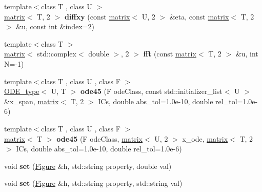 \begin{DoxyCompactItemize}
\item 
\hypertarget{namespacekeycpp_adbb28bb59e9e552598c05ebe9d1af397}{{\footnotesize template$<$class T , class U $>$ }\\\hyperlink{classkeycpp_1_1matrix}{matrix}$<$ T, 2 $>$ {\bfseries diffxy} (const \hyperlink{classkeycpp_1_1matrix}{matrix}$<$ U, 2 $>$ \&eta, const \hyperlink{classkeycpp_1_1matrix}{matrix}$<$ T, 2 $>$ \&u, const int \&index=2)}\label{namespacekeycpp_adbb28bb59e9e552598c05ebe9d1af397}

\item 
\hypertarget{namespacekeycpp_a1fcfb748997291434fe9db7dbffd8c6f}{{\footnotesize template$<$class T $>$ }\\\hyperlink{classkeycpp_1_1matrix}{matrix}$<$ std\-::complex$<$ double $>$, 2 $>$ {\bfseries fft} (const \hyperlink{classkeycpp_1_1matrix}{matrix}$<$ T, 2 $>$ \&u, int N=-\/1)}\label{namespacekeycpp_a1fcfb748997291434fe9db7dbffd8c6f}

\item 
\hypertarget{namespacekeycpp_a6d7114f640a4a253a1d50ffc810bdad0}{{\footnotesize template$<$class T , class U , class F $>$ }\\\hyperlink{structkeycpp_1_1_o_d_e__type}{O\-D\-E\-\_\-type}$<$ U, T $>$ {\bfseries ode45} (F ode\-Class, const std\-::initializer\-\_\-list$<$ U $>$ \&x\-\_\-span, \hyperlink{classkeycpp_1_1matrix}{matrix}$<$ T, 2 $>$ I\-Cs, double abs\-\_\-tol=1.\-0e-\/10, double rel\-\_\-tol=1.\-0e-\/6)}\label{namespacekeycpp_a6d7114f640a4a253a1d50ffc810bdad0}

\item 
\hypertarget{namespacekeycpp_aeea0edbbd76794e73bfade1d428f5dd7}{{\footnotesize template$<$class T , class U , class F $>$ }\\\hyperlink{classkeycpp_1_1matrix}{matrix}$<$ T $>$ {\bfseries ode45} (F ode\-Class, \hyperlink{classkeycpp_1_1matrix}{matrix}$<$ U, 2 $>$ x\-\_\-ode, \hyperlink{classkeycpp_1_1matrix}{matrix}$<$ T, 2 $>$ I\-Cs, double abs\-\_\-tol=1.\-0e-\/10, double rel\-\_\-tol=1.\-0e-\/6)}\label{namespacekeycpp_aeea0edbbd76794e73bfade1d428f5dd7}

\item 
\hypertarget{namespacekeycpp_afcd6ae07fc18f5374868fe314f00108c}{void {\bfseries set} (\hyperlink{classkeycpp_1_1_figure}{Figure} \&h, std\-::string property, double val)}\label{namespacekeycpp_afcd6ae07fc18f5374868fe314f00108c}

\item 
\hypertarget{namespacekeycpp_a53fd8f41e3cdddb0dcca913eef5ee329}{void {\bfseries set} (\hyperlink{classkeycpp_1_1_figure}{Figure} \&h, std\-::string property, std\-::string val)}\label{namespacekeycpp_a53fd8f41e3cdddb0dcca913eef5ee329}


\end{DoxyCompactItemize}
